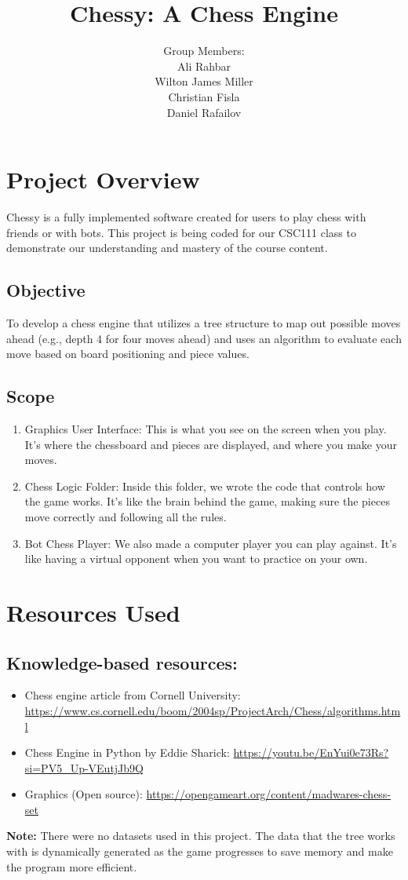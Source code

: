 \documentclass{article}
\title{Chessy: A Chess Engine}
\author{Group Members:\\Ali Rahbar\\Wilton James Miller\\Christian Fisla\\Daniel Rafailov}
\date{}
\begin{document}
\maketitle

\section*{Project Overview}
Chessy is a fully implemented software created for users to play chess with friends or with bots. This project is being coded for our CSC111 class to demonstrate our understanding and mastery of the course content.

\subsection*{Objective}
To develop a chess engine that utilizes a tree structure to map out possible moves ahead (e.g., depth 4 for four moves ahead) and uses an algorithm to evaluate each move based on board positioning and piece values.

\subsection*{Scope}
\begin{enumerate}
    \item Graphics User Interface: This is what you see on the screen when you play. It's where the chessboard and pieces are displayed, and where you make your moves.
    \item Chess Logic Folder: Inside this folder, we wrote the code that controls how the game works. It's like the brain behind the game, making sure the pieces move correctly and following all the rules.
    \item Bot Chess Player: We also made a computer player you can play against. It's like having a virtual opponent when you want to practice on your own.
\end{enumerate}

\section*{Resources Used}
\subsection*{Knowledge-based resources:}
\begin{itemize}
    \item Chess engine article from Cornell University: \url{https://www.cs.cornell.edu/boom/2004sp/ProjectArch/Chess/algorithms.html}
    \item Chess Engine in Python by Eddie Sharick: \url{https://youtu.be/EnYui0e73Rs?si=PV5_Up-VEutjJb9Q}
    \item Graphics (Open source): \url{https://opengameart.org/content/madwares-chess-set}
\end{itemize}
\textbf{Note:} There were no datasets used in this project. The data that the tree works with is dynamically generated as the game progresses to save memory and make the program more efficient.
\end{document}
